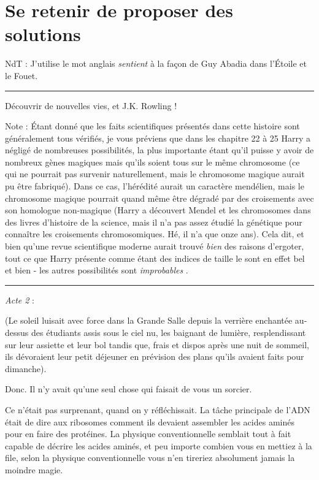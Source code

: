 
\chapter{Se retenir de proposer des solutions}

NdT : J'utilise le mot anglais \emph{sentient}  à la façon de Guy Abadia dans l'Étoile et le Fouet.
\par\noindent\rule{\textwidth}{0.4pt}
Découvrir de nouvelles vies, et J.K. Rowling !

Note : Étant donné que les faits scientifiques présentés dans cette histoire sont généralement tous vérifiés, je vous préviens que dans les chapitre 22 à 25 Harry a négligé de nombreuses possibilités, la plus importante étant qu'il puisse y avoir de nombreux gènes magiques mais qu'ils soient tous sur le même chromosome (ce qui ne pourrait pas survenir naturellement, mais le chromosome magique aurait pu être fabriqué). Dans ce cas, l'hérédité aurait un caractère mendélien, mais le chromosome magique pourrait quand même être dégradé par des croisements avec son homologue non-magique (Harry a découvert Mendel et les chromosomes dans des livres d'histoire de la science, mais il n'a pas assez étudié la génétique pour connaître les croisements chromosomiques. Hé, il n'a que onze ans). Cela dit, et bien qu'une revue scientifique moderne aurait trouvé \emph{bien}  des raisons d'ergoter, tout ce que Harry présente comme étant des indices de taille le sont en effet bel et bien - les autres possibilités sont \emph{improbables} .
\par\noindent\rule{\textwidth}{0.4pt}
\emph{Acte 2} :

(Le soleil luisait avec force dans la Grande Salle depuis la verrière enchantée au-dessus des étudiants assis sous le ciel nu, les baignant de lumière, resplendissant sur leur assiette et leur bol tandis que, frais et dispos après une nuit de sommeil, ils dévoraient leur petit déjeuner en prévision des plans qu'ils avaient faits pour dimanche).

Donc. Il n'y avait qu'une seul chose qui faisait de vous un sorcier.

Ce n'était pas surprenant, quand on y réfléchissait. La tâche principale de l'ADN était de dire aux ribosomes comment ils devaient assembler les acides aminés pour en faire des protéines. La physique conventionnelle semblait tout à fait capable de décrire les acides aminés, et peu importe combien vous en mettiez à la file, selon la physique conventionnelle vous n'en tireriez absolument jamais la moindre magie.

